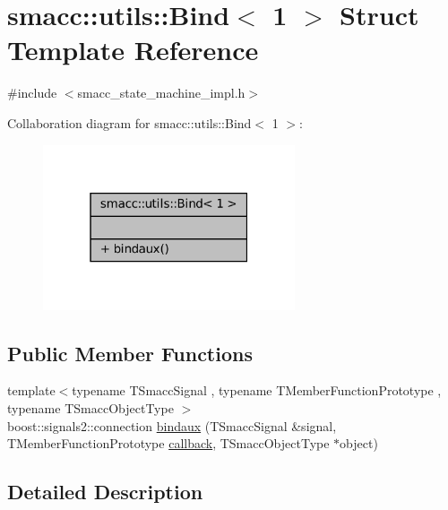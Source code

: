 \hypertarget{structsmacc_1_1utils_1_1Bind_3_011_01_4}{}\section{smacc\+:\+:utils\+:\+:Bind$<$ 1 $>$ Struct Template Reference}
\label{structsmacc_1_1utils_1_1Bind_3_011_01_4}


{\ttfamily \#include $<$smacc\+\_\+state\+\_\+machine\+\_\+impl.\+h$>$}



Collaboration diagram for smacc\+:\+:utils\+:\+:Bind$<$ 1 $>$\+:
\nopagebreak
\begin{figure}[H]
\begin{center}
\leavevmode
\includegraphics[width=211pt]{structsmacc_1_1utils_1_1Bind_3_011_01_4__coll__graph}
\end{center}
\end{figure}
\subsection*{Public Member Functions}
\begin{DoxyCompactItemize}
\item 
{\footnotesize template$<$typename T\+Smacc\+Signal , typename T\+Member\+Function\+Prototype , typename T\+Smacc\+Object\+Type $>$ }\\boost\+::signals2\+::connection \hyperlink{structsmacc_1_1utils_1_1Bind_3_011_01_4_a5704d3cff0b914fc899ff385ff8f8bc2}{bindaux} (T\+Smacc\+Signal \&signal, T\+Member\+Function\+Prototype \hyperlink{3_2servers_2opencv__perception__node_2opencv__perception__node_8cpp_a050e697bd654facce10ea3f6549669b3}{callback}, T\+Smacc\+Object\+Type $\ast$object)
\end{DoxyCompactItemize}


\subsection{Detailed Description}
